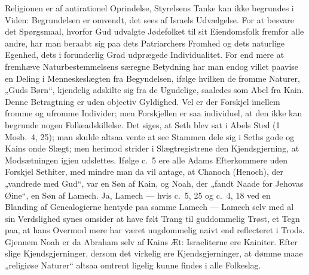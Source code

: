 \documentclass[12pt]{book}
\begin{document}
Religionen er af antirationel Oprindelse, Styrelsens Tanke kan ikke
begrundes i Viden: Begrundelsen er omvendt, det sees af Israels
Udvælgelse. For at besvare det Spørgsmaal, hvorfor Gud udvalgte
Jødefolket til sit Eiendomsfolk fremfor alle andre, har man beraabt
sig paa dets Patriarchers Fromhed og dets naturlige Egenhed, dets i
forunderlig Grad udprægede Individualitet. For
end mere at fremhæve Naturbestemmelsens særegne Betydning har man
endog villet paavise en Deling i Menneskeslægten fra Begyndelsen,
ifølge hvilken de fromme Naturer, „Guds Børn“, kjendelig adskilte
sig fra de Ugudelige, saaledes som Abel fra Kain. Denne Betragtning
er uden objectiv Gyldighed. Vel er der Forskjel imellem fromme og
ufromme Individer; men Forskjellen er saa individuel, at den ikke
kan begrunde nogen Folkeadskillelse. Det siges, at Seth blev sat i
Abels Sted (1 Mosb.\ 4, 25); man skulde altsaa vente at see Stammen
dele sig i Seths gode og Kains onde Slægt; men herimod strider i
Slægtregistrene den Kjendsgjerning, at Modsætningen igjen udslettes.
Ifølge c.\ 5 ere alle Adams Efterkommere uden Forskjel Sethiter, med
mindre man da vil antage, at Chanoch (Henoch), der „vandrede med
Gud“, var en Søn af Kain, og Noah, der „fandt Naade for Jehovas
Øine“, en Søn af Lamech. Ja, Lamech --- hvis c.\ 5, 25 og c.\ 4, 18
ved en Blanding af Genealogierne hentyde paa samme Lamech ---
Lamech selv med al sin Verdslighed synes omsider at have følt Trang
til guddommelig Trøst, et Tegn paa, at hans Overmod mere har været
ungdommelig naivt end reflecteret i Trods. Gjennem
Noah er da Abraham selv af Kains Æt: Israeliterne ere Kainiter.
Efter slige Kjendsgjerninger, dersom det virkelig ere
Kjendsgjerninger, at dømme maae „religiøse Naturer“ altsaa omtrent
ligelig kunne findes i alle Folkeslag.
\end{document}
